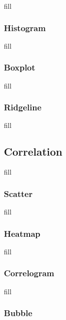 \documentclass[
  b5paper]{book}
\begin{document}
fill

\hypertarget{histogram}{%
\subsubsection*{Histogram}\label{histogram}}

fill

\hypertarget{boxplot}{%
\subsubsection*{Boxplot}\label{boxplot}}

fill

\hypertarget{ridgeline}{%
\subsubsection*{Ridgeline}\label{ridgeline}}

fill

\hypertarget{correlation}{%
\subsection*{Correlation}\label{correlation}}

fill

\hypertarget{scatter}{%
\subsubsection*{Scatter}\label{scatter}}

fill

\hypertarget{heatmap}{%
\subsubsection*{Heatmap}\label{heatmap}}

fill

\hypertarget{correlogram}{%
\subsubsection*{Correlogram}\label{correlogram}}

fill

\hypertarget{bubble}{%
\subsubsection*{Bubble}\label{bubble}}
\end{document}
